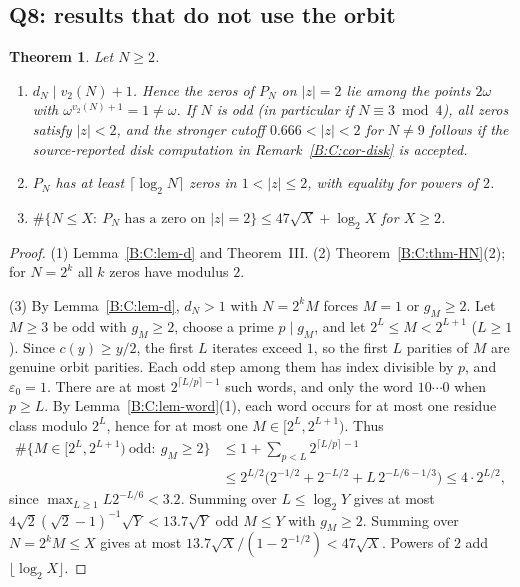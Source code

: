 \documentclass[11pt,a4paper]{article}
\newtheorem{theorem}{Theorem}[section]
\theoremstyle{definition}
\theoremstyle{remark}
\numberwithin{equation}{section}
\begin{document}
\subsection{Q8: results that do not use the orbit}\label{B:C:ssec-Q8}

\begin{theorem}\label{B:C:thm-Q8}
Let $N\ge2$.
\begin{enumerate}
\item $d_N\mid v_2(N)+1$.  Hence the zeros of $P_N$ on $|z|=2$ lie among the
points $2\omega$ with $\omega^{v_2(N)+1}=1\ne\omega$.  If $N$ is odd (in
particular if $N\equiv3\bmod4$), all zeros satisfy $|z|<2$, and the stronger cutoff $0.666<|z|<2$ for $N\ne9$ follows if the
source-reported disk computation in Remark~\ref{B:C:cor-disk} is accepted.
\item $P_N$ has at least $\lceil\log_2N\rceil$ zeros in $1<|z|\le2$, with
equality for powers of $2$.
\item $\#\{N\le X:\ P_N\text{ has a zero on }|z|=2\}\le47\sqrt X+\log_2X$ for
$X\ge2$.
\end{enumerate}
\end{theorem}

\begin{proof}
(1) Lemma~\ref{B:C:lem-d} and Theorem~III.  (2) Theorem~\ref{B:C:thm-HN}(2); for
$N=2^k$ all $k$ zeros have modulus $2$.

(3) By Lemma~\ref{B:C:lem-d}, $d_N>1$ with $N=2^kM$ forces $M=1$ or $g_M\ge2$.
Let $M\ge3$ be odd with $g_M\ge2$, choose a prime $p\mid g_M$, and let
$2^L\le M<2^{L+1}$ ($L\ge1$).  Since $c(y)\ge y/2$, the first $L$ iterates
exceed $1$, so the first $L$ parities of $M$ are genuine orbit parities.  Each
odd step among them has index divisible by $p$, and $\varepsilon_0=1$.  There
are at most $2^{\lceil L/p\rceil-1}$ such words, and only the word $10\cdots0$
when $p\ge L$.  By Lemma~\ref{B:C:lem-word}(1), each word occurs for at most one
residue class modulo $2^L$, hence for at most one $M\in[2^L,2^{L+1})$.  Thus
\[
\begin{aligned}
\#\{M\in[2^L,2^{L+1})\ \text{odd}:\ g_M\ge2\}
 &\le1+\sum_{p<L}2^{\lceil L/p\rceil-1}\\
 &\le 2^{L/2}\bigl(2^{-1/2}+2^{-L/2}+L\,2^{-L/6-1/3}\bigr)
 \le4\cdot2^{L/2},
\end{aligned}
\]
since $\max_{L\ge1}L2^{-L/6}<3.2$.  Summing over $L\le\log_2Y$ gives at most
$4\sqrt2(\sqrt2-1)^{-1}\sqrt Y<13.7\sqrt Y$ odd $M\le Y$ with $g_M\ge2$.  Summing
over $N=2^kM\le X$ gives at most $13.7\sqrt X/(1-2^{-1/2})<47\sqrt X$.  Powers of
$2$ add $\lfloor\log_2X\rfloor$.
\end{proof}
\end{document}
